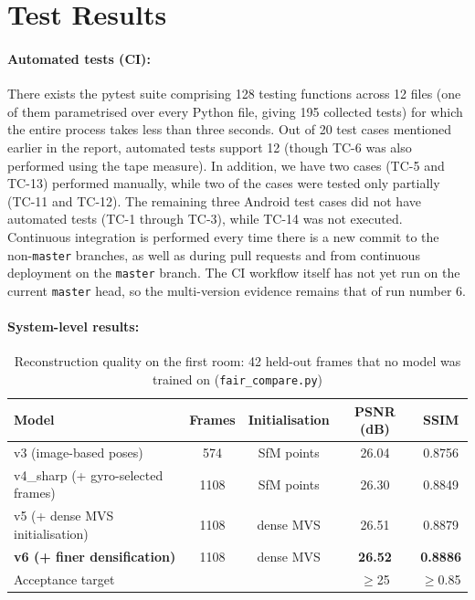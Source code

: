 \section{Test Results}

\paragraph{Automated tests (CI):}
There exists the pytest suite comprising 128 testing functions across 12 files (one of them parametrised over every Python file, giving 195 collected tests) for which the entire process takes less than three seconds. Out of 20 test cases mentioned earlier in the report, automated tests support 12 (though TC-6 was also performed using the tape measure). In addition, we have two cases (TC-5 and TC-13) performed manually, while two of the cases were tested only partially (TC-11 and TC-12). The remaining three Android test cases did not have automated tests (TC-1 through TC-3), while TC-14 was not executed. Continuous integration is performed every time there is a new commit to the non-\texttt{master} branches, as well as during pull requests and from continuous deployment on the \texttt{master} branch. The CI workflow itself has not yet run on the current \texttt{master} head, so the multi-version evidence remains that of run number 6.

\paragraph{System-level results:}

\begin{table}[htbp]
\centering
\caption{Reconstruction quality on the first room: 42 held-out frames that no model was trained on (\texttt{fair\_compare.py})}
\label{tab:quality}
\begin{tabular}{p{4.2cm}cccc}
\toprule
\textbf{Model} & \textbf{Frames} & \textbf{Initialisation} & \textbf{PSNR (dB)} & \textbf{SSIM} \\
\midrule
v3 (image-based poses) & 574 & SfM points & 26.04 & 0.8756 \\
v4\_sharp (+ gyro-selected frames) & 1108 & SfM points & 26.30 & 0.8849 \\
v5 (+ dense MVS initialisation) & 1108 & dense MVS & 26.51 & 0.8879 \\
\textbf{v6 (+ finer densification)} & 1108 & dense MVS & \textbf{26.52} & \textbf{0.8886} \\
\midrule
Acceptance target & & & $\geq$25 & $\geq$0.85 \\
\bottomrule
\end{tabular}
\end{table}


